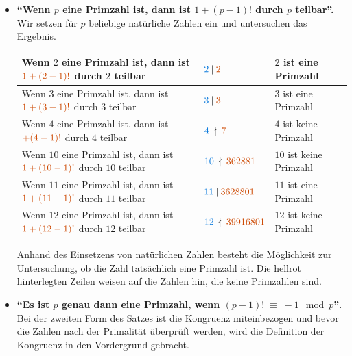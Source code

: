 \begin{itemize}
 \item \textbf{``Wenn $p$ eine Primzahl ist, dann ist
       $1+(p-1)!$ durch $p$ teilbar''.}\\
       Wir setzen für $p$ beliebige natürliche Zahlen ein
       und untersuchen das Ergebnis.
       \begin{table}[H]
        \begin{tabular}{|l|l|l|}
          \hline
          Wenn $2$ eine Primzahl ist, dann ist $\color{DarkOrange}{1+(2-1)!}$ durch $2$ teilbar & ${\color{MidCyan} 2} \:|\: \color{DarkOrange}{2}$ & $2$ ist eine Primzahl \\
          \hline
          Wenn $3$ eine Primzahl ist, dann ist $\color{DarkOrange}{1+(3-1)!}$ durch $3$ teilbar & ${\color{MidCyan} 3} \:|\: \color{DarkOrange}{3}$ & $3$ ist eine Primzahl \\
          \hline
          \rowcolor{LightRed}
          Wenn $4$ eine Primzahl ist, dann ist $\color{DarkOrange}{+(4-1)!}$ durch $4$ teilbar & ${\color{MidCyan} 4} \:\nmid\: \color{DarkOrange}{7}$ & $4$ ist keine Primzahl \\
          \hline
          \rowcolor{LightRed}
          Wenn $10$ eine Primzahl ist, dann ist $\color{DarkOrange}{1+(10-1)!}$ durch $10$ teilbar & ${\color{MidCyan} 10} \:\nmid\: \color{DarkOrange}{362881}$ & $10$ ist keine Primzahl \\
          \hline
          Wenn $11$ eine Primzahl ist, dann ist $\color{DarkOrange}{1+(11-1)!}$ durch $11$ teilbar & ${\color{MidCyan} 11} \:|\: \color{DarkOrange}{3628801}$ & $11$ ist eine Primzahl \\
          \hline
          \rowcolor{LightRed}
          Wenn $12$ eine Primzahl ist, dann ist $\color{DarkOrange}{1+(12-1)!}$ durch $12$ teilbar & ${\color{MidCyan} 12} \:\nmid\: \color{DarkOrange}{39916801}$ & $12$ ist keine Primzahl \\
          \hline
        \end{tabular}
       \end{table}
       
       Anhand des Einsetzens von natürlichen Zahlen besteht
       die Möglichkeit zur Untersuchung, ob die Zahl
       tatsächlich eine Primzahl ist. Die hellrot
       hinterlegten Zeilen weisen auf die Zahlen hin, die
       keine Primzahlen sind.
       
 \item \textbf{``Es ist $p$ genau dann eine Primzahl, wenn
       $(p-1)! \;\equiv\; -1 \mod p$''}.\\
       
       Bei der zweiten Form des Satzes ist die Kongruenz
       miteinbezogen und bevor die Zahlen nach der
       Primalität überprüft werden, wird die Definition der
       Kongruenz in den Vordergrund gebracht.
\end{itemize}

